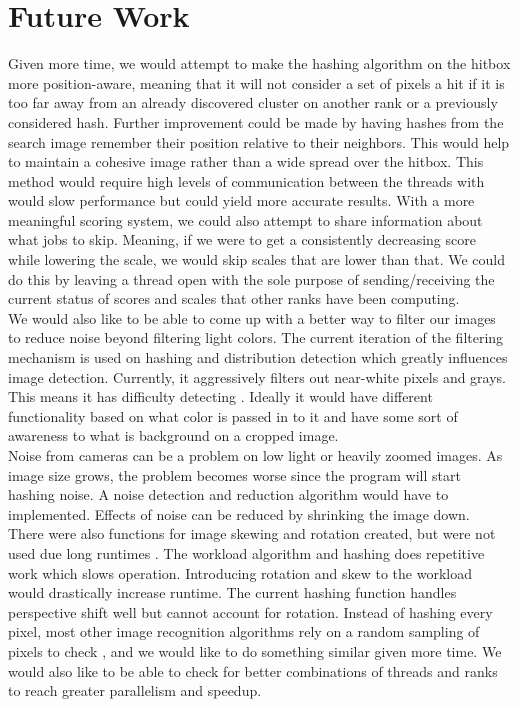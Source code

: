 \documentclass[10pt, journal]{vgtc}                %
\begin{document}
\section{Future Work}
Given more time, we would attempt to make the hashing algorithm on the hitbox more position-aware, meaning that it will not consider a set of pixels a hit if it is too far away from an already discovered cluster on another rank or a previously considered hash. Further improvement could be made by having hashes from the search image remember their position relative to their neighbors. This would help to maintain a cohesive image rather than a wide spread over the hitbox. This method would require high levels of communication between the threads with would slow performance but could yield more accurate results. With a more meaningful scoring system, we could also attempt to share information about what jobs to skip. Meaning, if we were to get a consistently decreasing score while lowering the scale, we would skip scales that are lower than that. We could do this by leaving a thread open with the sole purpose of sending/receiving the current status of scores and scales that other ranks have been computing. \\
We would also like to be able to come up with a better way to filter our images to reduce noise beyond filtering light colors. The current iteration of the filtering mechanism is used on hashing and distribution detection which greatly influences image detection. Currently, it aggressively filters out near-white pixels and grays. This means it has difficulty detecting . Ideally it would have different functionality based on what color is passed in to it and have some sort of awareness to what is background on a cropped image.  \\
Noise from cameras can be a problem on low light or heavily zoomed images. As image size grows, the problem becomes worse since the program will start hashing noise. A noise detection and reduction algorithm would have to implemented. Effects of noise can be reduced by shrinking the image down. \\
There were also functions for image skewing and rotation created, but were not used due long runtimes \cite{Paeth:1990:FAG:90767.90811}. The workload algorithm and hashing does repetitive work which slows operation. Introducing rotation and skew to the workload would drastically increase runtime. The current hashing function handles perspective shift well but cannot account for rotation.
Instead of hashing every pixel, most other image recognition algorithms rely on a random sampling of pixels to check \cite{7838673,1634363}, and we would like to do something similar given more time. We would also like to be able to check for better combinations of threads and ranks to reach greater parallelism and speedup. 
\end{document}
